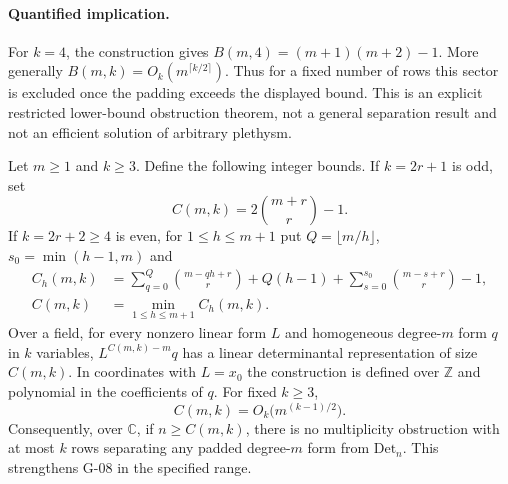 \paragraph{Quantified implication.}
For $k=4$, the construction gives $B(m,4)=(m+1)(m+2)-1$. More generally $B(m,k)=O_k(m^{\lceil k/2\rceil})$. Thus for a fixed number of rows this sector is excluded once the padding exceeds the displayed bound. This is an explicit restricted lower-bound obstruction theorem, not a general separation result and not an efficient solution of arbitrary plethysm.

\begin{proposition}\label{G-09}
Let $m\geq1$ and $k\geq3$. Define the following integer bounds. If $k=2r+1$ is odd, set
\[
 C(m,k)=2\binom{m+r}{r}-1.
\]
If $k=2r+2\geq4$ is even, for $1\leq h\leq m+1$ put $Q=\lfloor m/h\rfloor$, $s_0=\min(h-1,m)$ and
\[
\begin{aligned}
 C_h(m,k)&=\sum_{q=0}^{Q}\binom{m-qh+r}{r}+Q(h-1)
          +\sum_{s=0}^{s_0}\binom{m-s+r}{r}-1,\\
 C(m,k)&=\min_{1\leq h\leq m+1}C_h(m,k).
\end{aligned}
\]
Over a field, for every nonzero linear form $L$ and homogeneous degree-$m$ form $q$ in $k$ variables, $L^{C(m,k)-m}q$ has a linear determinantal representation of size $C(m,k)$. In coordinates with $L=x_0$ the construction is defined over $\mathbb Z$ and polynomial in the coefficients of $q$. For fixed $k\geq3$,
\[
 C(m,k)=O_k\bigl(m^{(k-1)/2}\bigr).
\]
Consequently, over $\mathbb C$, if $n\geq C(m,k)$, there is no multiplicity obstruction with at most $k$ rows separating any padded degree-$m$ form from $\mathrm{Det}_n$. This strengthens G-08 in the specified range.
\end{proposition}
